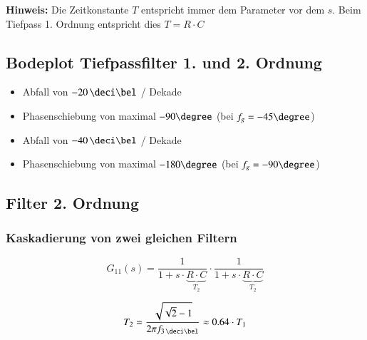 \textbf{Hinweis:} Die Zeitkonstante $T$ entspricht immer dem Parameter vor dem $s$. 
Beim Tiefpass 1. Ordnung entspricht dies $T = R \cdot C$


\subsection{Bodeplot Tiefpassfilter 1. und 2. Ordnung}

\begin{minipage}[t]{0.48\columnwidth}
    \begin{center}
    \end{center}
    \begin{itemize}
        \item Abfall von $- 20\, \deci \bel$ / Dekade
        \item Phasenschiebung von maximal $- 90 \degree$ (bei $f_g = -45 \degree$)
    \end{itemize}
\end{minipage}
\hfill
\begin{minipage}[t]{0.48\columnwidth}
    \begin{center}
    \end{center}
    \begin{itemize}
        \item Abfall von $- 40\, \deci \bel$ / Dekade
        \item Phasenschiebung von maximal $- 180 \degree$ (bei $f_g = -90 \degree$)
    \end{itemize}
\end{minipage}


\subsection{Filter 2. Ordnung}

\subsubsection{Kaskadierung von zwei gleichen Filtern}

\begin{minipage}[c]{0.48\columnwidth}
    $$ G_{11}(s) = \frac{1}{1 + s \cdot \underbrace{R \cdot C}_{T_2}} \cdot \frac{1}{1 + s \cdot \underbrace{R \cdot C}_{T_2}} $$
\end{minipage}
\hfill
\begin{minipage}[c]{0.48\columnwidth}
    $$ T_2 = \frac{\sqrt{\sqrt{2} - 1}}{2 \pi f_{3 \, \deci \bel} } \approx 0.64 \cdot T_1  $$
\end{minipage}

